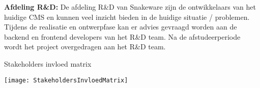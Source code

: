 \whitespace
\textbf{Afdeling R\&D:} De afdeling R\&D van Snakeware zijn de ontwikkelaars van het huidige \gls{CMS} en kunnen veel inzicht bieden in de huidige situatie / problemen.
Tijdens de realisatie en ontwerpfase kan er advies gevraagd worden aan de backend en frontend developers van het R\&D team.
Na de afstudeerperiode wordt het project overgedragen aan het R\&D team.

\begin{graphic}
	\captionsetup{type=figure}
	\caption{Stakeholders invloed matrix}
	\texttt{[image: StakeholdersInvloedMatrix]}
	\label{fig:StakeholdersInvloedMatrix}
\end{graphic}


